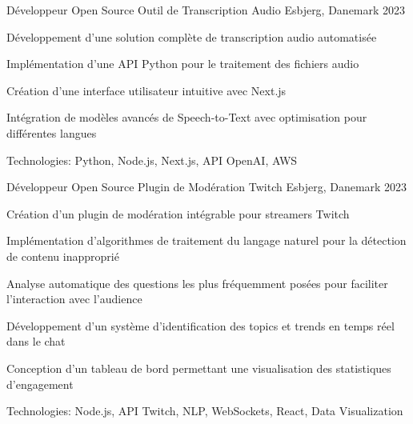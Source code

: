 


\begin{cventries}


\cventry
{Développeur Open Source} %
{Outil de Transcription Audio} %
{Esbjerg, Danemark} %
{2023} %
{ %
\begin{cvitems}
\item {Développement d'une solution complète de transcription audio automatisée}
\item {Implémentation d'une API Python pour le traitement des fichiers audio}
\item {Création d'une interface utilisateur intuitive avec Next.js}
\item {Intégration de modèles avancés de Speech-to-Text avec optimisation pour différentes langues}
\item {Technologies: Python, Node.js, Next.js, API OpenAI, AWS}
\end{cvitems}
}
\vspace{1.5em}


\cventry
{Développeur Open Source} %
{Plugin de Modération Twitch} %
{Esbjerg, Danemark} %
{2023} %
{ %
\begin{cvitems}
\item {Création d'un plugin de modération intégrable pour streamers Twitch}
\item {Implémentation d'algorithmes de traitement du langage naturel pour la détection de contenu inapproprié}
\item {Analyse automatique des questions les plus fréquemment posées pour faciliter l'interaction avec l'audience}
\item {Développement d'un système d'identification des topics et trends en temps réel dans le chat}
\item {Conception d'un tableau de bord permettant une visualisation des statistiques d'engagement}
\item {Technologies: Node.js, API Twitch, NLP, WebSockets, React, Data Visualization}
\end{cvitems}
}
\vspace{1.5em}


\end{cventries}
